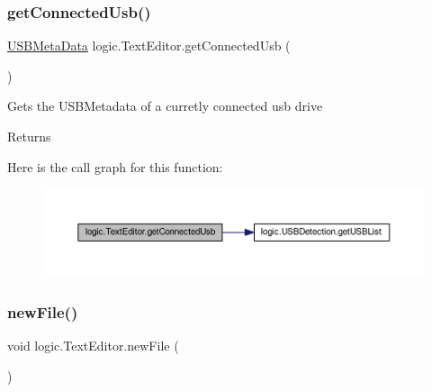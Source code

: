 \subsubsection{\texorpdfstring{get\+Connected\+Usb()}{getConnectedUsb()}}
{\footnotesize\ttfamily \mbox{\hyperlink{classpersistence_1_1_u_s_b_meta_data}{U\+S\+B\+Meta\+Data}} logic.\+Text\+Editor.\+get\+Connected\+Usb (\begin{DoxyParamCaption}{ }\end{DoxyParamCaption})\hspace{0.3cm}{\ttfamily [private]}}

Gets the U\+S\+B\+Metadata of a curretly connected usb drive \begin{DoxyReturn}{Returns}

\end{DoxyReturn}
Here is the call graph for this function\+:\nopagebreak
\begin{figure}[H]
\begin{center}
\leavevmode
\includegraphics[width=350pt]{classlogic_1_1_text_editor_abc9623f0e47f9ffaf55f6489ef2965f4_cgraph}
\end{center}
\end{figure}
\mbox{\label{classlogic_1_1_text_editor_a03b71fe113e6549963206a005913176a}} 
\subsubsection{\texorpdfstring{new\+File()}{newFile()}}
{\footnotesize\ttfamily void logic.\+Text\+Editor.\+new\+File (\begin{DoxyParamCaption}{ }\end{DoxyParamCaption})\hspace{0.3cm}{\ttfamily [private]}}

